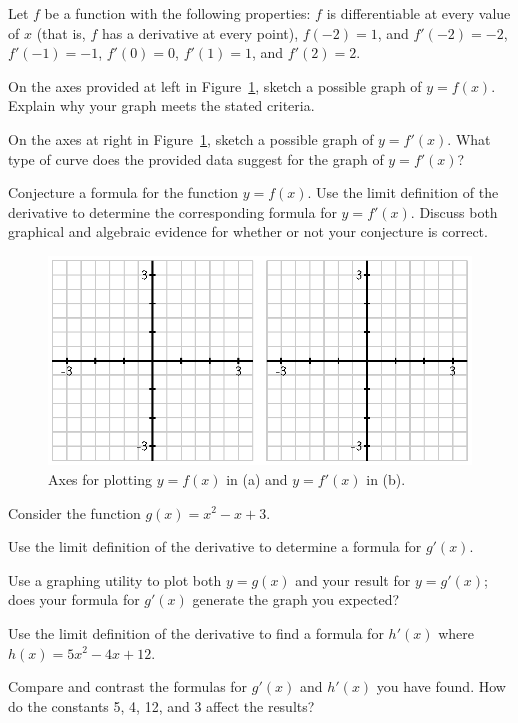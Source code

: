 \begin{exercises} 
\item Let $f$ be a function with the following properties:  $f$ is differentiable at every value of $x$ (that is, $f$ has a derivative at every point), $f(-2) = 1$, and $f'(-2) = -2$, $f'(-1) = -1$, $f'(0) = 0$, $f'(1) = 1$, and $f'(2) = 2$.
\ba
	\item On the axes provided at left in Figure~\ref{F:1.4.Ez1}, sketch a possible graph of $y = f(x)$.  Explain why your graph meets the stated criteria.
	\item On the axes at right in Figure~\ref{F:1.4.Ez1}, sketch a possible graph of $y = f'(x)$.  What type of curve does the provided data suggest for the graph of $y = f'(x)$?
	\item Conjecture a formula for the function $y = f(x)$.  Use the limit definition of the derivative to determine the corresponding formula for $y = f'(x)$.  Discuss both graphical and algebraic evidence for whether or not your conjecture is correct.
\ea
\begin{figure}[h]
  \begin{center}
 \includegraphics{figures/1_2_Ez3.eps} %
   \end{center}
   \caption{Axes for plotting $y = f(x)$ in (a) and $y = f'(x)$ in (b).} \label{F:1.4.Ez1}
\end{figure}
\begin{exerciseSolution}
\end{exerciseSolution}

\item Consider the function $g(x) = x^2 - x + 3$.
\ba
	\item Use the limit definition of the derivative to determine a formula for $g'(x)$.
	\item Use a graphing utility to plot both $y = g(x)$ and your result for $y = g'(x)$; does your formula for $g'(x)$ generate the graph you expected?
	\item Use the limit definition of the derivative to find a formula for $h'(x)$ where $h(x) = 5x^2 - 4x + 12.$
	\item Compare and contrast the formulas for $g'(x)$ and $h'(x)$ you have found.  How do the constants 5, 4, 12, and 3 affect the results?
\ea	



\end{exercises}
